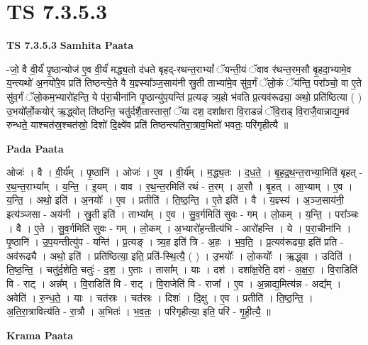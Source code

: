\documentclass[17pt]{extarticle}
\begin{document}
\section{ TS 7.3.5.3 }

\textbf{TS 7.3.5.3 } \newline
\textbf{Samhita Paata} \newline

-जो॒ वै वी॒र्यं॑ पृ॒ष्ठान्योज॑ ए॒व वी॒र्यं॑ मद्ध्य॒तो द॑धते बृहद्-रथन्त॒राभ्यां᳚ ॅयन्ती॒यं ॅवाव र॑थन्त॒रम॒सौ बृ॒हदा॒भ्यामे॒व य॒न्त्यथो॑ अ॒नयो॑रे॒व प्रति॑ तिष्ठन्त्ये॒ते वै य॒ज्ञ्स्या᳚ञ्ज॒साय॑नी स्रु॒ती ताभ्या॑मे॒व सु॑व॒र्गं ॅलो॒कं ॅय॑न्ति॒ परा᳚ञ्चो॒ वा ए॒ते सु॑व॒र्गं ॅलो॒कम॒भ्यारो॑हन्ति॒ ये प॑रा॒चीना॑नि पृ॒ष्ठान्यु॑प॒यन्ति॑ प्र॒त्यङ् त्र्य॒हो भ॑वति प्र॒त्यव॑रूढ्या॒ अथो॒ प्रति॑ष्ठित्या ( ) उ॒भयो᳚र्लो॒कयोर्॑ ऋ॒द्ध्वोत् ति॑ष्ठन्ति॒ चतु॑र्दशै॒तास्तासां॒ ॅया दश॒ दशा᳚क्षरा वि॒राडन्नं॑ ॅवि॒राड् वि॒राजै॒वान्नाद्य॒मव॑ रुन्धते॒ याश्चत॑स्र॒श्चत॑स्रो॒ दिशो॑ दि॒क्ष्वे॑व प्रति॑ तिष्ठन्त्यतिरा॒त्राव॒भितो॑ भवतः॒ परि॑गृहीत्यै ॥ \newline

\textbf{Pada Paata} \newline

ओजः॑ । वै । वी॒र्य᳚म् । पृ॒ष्ठानि॑ । ओजः॑ । ए॒व । वी॒र्य᳚म् । म॒द्ध्य॒तः । द॒ध॒ते॒ । बृ॒ह॒द्र॒थ॒न्त॒राभ्या॒मिति॑ बृहत् - र॒थ॒न्त॒राभ्या᳚म् । य॒न्ति॒ । इ॒यम् । वाव । र॒थ॒न्त॒रमिति॑ रथं - त॒रम् । अ॒सौ । बृ॒हत् । आ॒भ्याम् । ए॒व । य॒न्ति॒ । अथो॒ इति॑ । अ॒नयोः᳚ । ए॒व । प्रतीति॑ । ति॒ष्ठ॒न्ति॒ । ए॒ते इति॑ । वै । य॒ज्ञ्स्य॑ । अ॒ञ्ज॒साय॑नी॒ इत्य॑ञ्जसा - अय॑नी । स्रु॒ती इति॑ । ताभ्या᳚म् । ए॒व । सु॒व॒र्गमिति॑ सुवः - गम् । लो॒कम् । य॒न्ति॒ । परा᳚ञ्चः । वै । ए॒ते । सु॒व॒र्गमिति॑ सुवः - गम् । लो॒कम् । अ॒भ्यारो॑ह॒न्तीत्य॑भि - आरो॑हन्ति । ये । प॒रा॒चीना॑नि । पृ॒ष्ठानि॑ । उ॒प॒यन्तीत्यु॑प - यन्ति॑ । प्र॒त्यङ् । त्र्य॒ह इति॑ त्रि - अ॒हः । भ॒व॒ति॒ । प्र॒त्यव॑रूढ्या॒ इति॑ प्रति - अव॑रूढ्यै । अथो॒ इति॑ । प्रति॑ष्ठित्या॒ इति॒ प्रति॑-स्थि॒त्यै॒ ( ) । उ॒भयोः᳚ । लो॒कयोः᳚ । ऋ॒द्ध्वा । उदिति॑ । ति॒ष्ठ॒न्ति॒ । चतु॑र्द॒शेति॒ चतुः॑ - द॒श॒ । ए॒ताः । तासा᳚म् । याः । दश॑ । दशा᳚क्ष॒रेति॒ दश॑ - अ॒क्ष॒रा॒ । वि॒राडिति॑ वि - राट् । अन्न᳚म् । वि॒राडिति॑ वि - राट् । वि॒राजेति॑ वि - राजा᳚ । ए॒व । अ॒न्नाद्य॒मित्य॑न्न - अद्य᳚म् । अवेति॑ । रु॒न्ध॒ते॒ । याः । चत॑स्रः । चत॑स्रः । दिशः॑ । दि॒क्षु । ए॒व । प्रतीति॑ । ति॒ष्ठ॒न्ति॒ । अ॒ति॒रा॒त्रावित्य॑ति - रा॒त्रौ । अ॒भितः॑ । भ॒व॒तः॒ । परि॑गृहीत्या॒ इति॒ परि॑ - गृ॒ही॒त्यै॒ ॥  \newline


\textbf{Krama Paata} \newline
\end{document}
